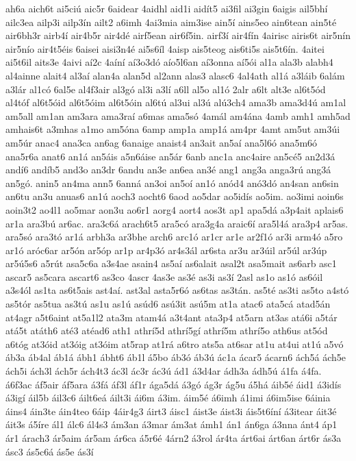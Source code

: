 {ah6a
aich6t
ai5ciú
aic5r
6aidear
4aidhl
aid1i
aidít5
ai3fil
ai3gin
6aigis
ail5bhí
ailc3ea
ailp3i
ailp3ín
ailt2
a6imh
4ai3mia
aim3ise
ain5í
ains5eo
ain6tean
ain5té
air6bh3r
airb4í
air4b5r
air4dé
airf5ean
air6f5in.
airf3í
air4fín
4airisc
airis6t
air5nín
air5nío
air4t5éis
6aisei
aisi3n4é
ai5s6íl
4aisp
ais5teog
ais6ti5s
ais5t6ín.
4aitei
ai5t6il
aits3e
4aivi
aí2c
4aíní
aí3o3dó
aío5l6an
aí3onna
aí5ói
al1a
ala3b
alabh4
al4ainne
alait4
al3aí
alan4a
alan5d
al2ann
alas3
alasc6
4al4ath
al1á
a3láib
6alám
a3lár
al1có
6al5e
al4f3air
al3gó
al3i
a3lí
a6ll
al5o
al1ó
2alr
a6lt
alt3e
al6t5ód
al4tóf
al6t5óid
al6t5óim
al6t5óin
al6tú
al3ui
al3ú
alú3ch4
ama3b
ama3d4ú
am1al
am5all
am1an
am3ara
ama3raí
a6mas
ama5só
4amál
am4ána
4amb
amh1
amh5ad
amhais6t
a3mhas
a1mo
am5óna
6amp
amp1a
amp1á
am4pr
4amt
am5ut
am3úi
am5úr
anac4
ana3ca
an6ag
6anaige
anaist4
an3ait
an5aí
ana5l6ó
ana5m6ó
ana5r6a
anat6
an1á
an5áis
a5n6áise
an5ár
6anb
anc1a
anc4aire
an5cé5
an2d3á
andí6
andíb5
and3o
an3dr
6andu
an3e
an6ea
an3é
ang1
ang3a
anga3rú
ang3á
an5gó.
anin5
an4ma
ann5
6anná
an3oi
an5oí
an1ó
anód4
anó3dó
an4san
an6sin
an6tu
an3u
anuas6
an1ú
aoch3
aocht6
6aod
ao5dar
ao5idís
ao5im.
ao3imi
aoin6s
aoin3t2
ao4l1
ao5mar
aon3u
ao6r1
aorg4
aort4
aos3t
ap1
apa5dá
a3p4ait
aplais6
ar1a
ara3bú
ar6ac.
ara3c6á
arach6t5
ara5có
ara3g4a
araic6í
ara5l4á
ara3p4
ar5as.
ara5só
ara3tó
ar1á
arbh3a
ar3bhe
arch6
arc1ó
ar1cr
ar1e
ar2f1ó
ar3i
arm4ó
a5ro
ar1ó
aróc6ar
ar5ón
ar5óp
ar1p
ar4p3ó
ar4s3ál
ar6sta
ar3u
ar3úil
ar5úl
ar3úp
ar5ú5s6
a5rút
asa5c6a
a3s4ae
asain4
as5aí
as6alait
asal2t
asa5mait
as6arb
asc1
ascar5
as5cara
ascart6
as3co
4ascr
4as3e
as3é
as3i
as3í
2asl
as1o
as1ó
as6óil
a3s4ól
as1ta
as6t5ais
ast4aí.
ast3al
asta5r6ó
as6tas
as3tán.
as5té
as3ti
as5to
a4stó
as5tór
as5tua
as3tú
as1u
as1ú
asúd6
asú3it
asú5m
at1a
atac6
ata5cá
atad5án
at4agr
a5t6aint
at5a1l2
ata3m
atam4á
a3t4ant
ata3p4
at5arn
at3as
atá6i
a5tár
atá5t
atáth6
até3
atéad6
ath1
athrí5d
athrí5gí
athrí5m
athrí5o
ath6us
at5ód
a6tóg
at3óid
at3óig
at3óim
at5rap
at1rá
a6tro
ats5a
at6sar
at1u
at4ui
at1ú
a5vó
áb3a
áb4al
áb1á
ábh1
ábht6
áb1l
á5bo
áb3ó
áb3ú
ác1a
ácar5
ácarn6
ách5á
ách5e
ách5i
ách3l
ách5r
ách4t3
ác3l
ác3r
ác3ú
ád1
á3d4ar
ádh3a
ádh5ú
á1fa
á4fa.
á6f3ac
áf5air
áf5ara
á3fá
áf3l
áf1r
ága5dá
á3gó
ág3r
ág5u
á5há
áib5é
áid1
á3idís
á3igí
áil5b
áil3c6
áilt6eá
áilt3i
ái6m
á3im.
áim5é
á6imh
á1imi
á6im5ise
6áinia
áins4
áin3te
áin4teo
6áip
4áir4g3
áirt3
áisc1
áist3e
áist3i
áis5t6íní
á3itear
áit3é
áit3s
á5íre
ál1
álc6
ál4s3
ám3an
á3mar
ám3at
ámh1
án1
án6ga
á3nna
ánt4
áp1
ár1
árach3
ár5aim
ár5am
ár6ca
á5r6é
4árn2
á3rol
ár4ta
árt6ai
árt6an
árt6r
ás3a
ásc3
ás5c6á
ás5e
ás3í
}
